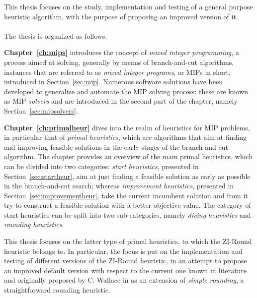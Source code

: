 \documentclass[a4paper,12pt,twoside]{scrbook}
\begin{document}
This thesis focuses on the study, implementation and testing of a general purpose heuristic algorithm, with the purpose of proposing an improved version of it. \\ \\ \vspace{0.2cm} 
The thesis is organized as follows. \par
\textbf{Chapter~\ref{ch:mips}} introduces the concept of \textit{mixed integer programming}, a process aimed at solving, generally by means of branch-and-cut algorithms, instances that are referred to as \textit{mixed integer programs}, or MIPs in short, introduced in Section~\ref{sec:mip}. Numerous software solutions have been developed to generalize and automate the MIP solving process: these are known as MIP \textit{solvers} and are introduced in the second part of the chapter, namely Section~\ref{sec:mipsolvers}. \vspace{0.2cm} \par
\textbf{Chapter~\ref{ch:primalheur}} dives into the realm of heuristics for MIP problems, in particular that of \textit{primal heuristics}, which are algorithms that aim at finding and improving feasible solutions in the early stages of the branch-and-cut algorithm. The chapter provides an overview of the main primal heuristics, which can be divided into two categories: \textit{start heuristics}, presented in Section~\ref{sec:startheur}, aim at just finding a feasible solution as early as possible in the branch-and-cut search; whereas \textit{improvement heuristics}, presented in Section~\ref{sec:improvementheur}, take the current incumbent solution and from it try to construct a feasible solution with a better objective value. The category of start heuristics can be split into two sub-categories, namely \textit{diving heuristics} and \textit{rounding heuristics}. \vspace{0.2cm} \par 
This thesis focuses on the latter type of primal heuristics, to which the ZI-Round heuristic belongs to. In particular, the focus is put on the implementation and testing of different versions of the ZI-Round heuristic, in an attempt to propose an improved default version with respect to the current one known in literature and originally proposed by C. Wallace in \cite{wallace2010} as an extension of \textit{simple rounding}, a straightforward rounding heuristic. \vspace{0.2cm} \par 
\end{document}

